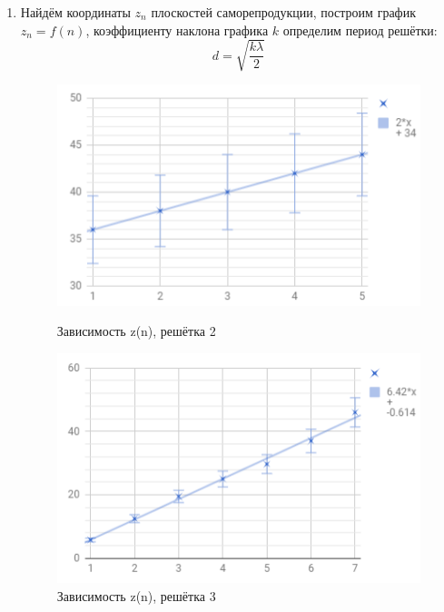 \documentclass[a4paper]{article}
\begin{document}
\begin{enumerate}
    \item Найдём координаты  $z_n$ плоскостей саморепродукции, построим график $z_n=f(n)$, коэффициенту наклона графика $k$ определим период решётки:
    \begin{equation}
    d = \sqrt{\frac{k \lambda}{2}}        
    \end{equation}
    
\begin{figure}[h]
\begin{center}
\begin{minipage}[h]{0.45\linewidth}
\includegraphics[width=1\linewidth]{g2.PNG}
\caption{Зависимость z(n), решётка 2} %
\label{ris:experimoriginal} %
\end{minipage}
\hfill 
\begin{minipage}[h]{0.45\linewidth}
\includegraphics[width=1\linewidth]{g3.PNG}
\caption{Зависимость z(n), решётка 3}
\label{ris:experimcoded}
\end{minipage}
\end{center}
\end{figure}


\end{enumerate}
\end{document}
